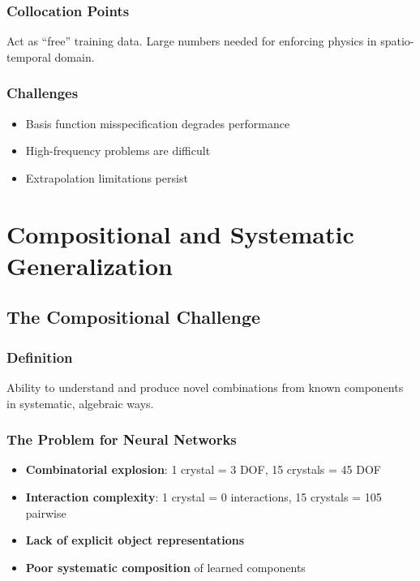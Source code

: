 \subsection{Collocation Points}
Act as ``free'' training data. Large numbers needed for enforcing physics in spatio-temporal domain.

\subsection{Challenges}
\begin{itemize}
    \item Basis function misspecification degrades performance
    \item High-frequency problems are difficult
    \item Extrapolation limitations persist
\end{itemize}

\chapter{Compositional and Systematic Generalization}

\section{The Compositional Challenge}

\subsection{Definition}
Ability to understand and produce novel combinations from known components in systematic, algebraic ways.

\subsection{The Problem for Neural Networks}
\begin{itemize}
    \item \textbf{Combinatorial explosion}: 1 crystal = 3 DOF, 15 crystals = 45 DOF
    \item \textbf{Interaction complexity}: 1 crystal = 0 interactions, 15 crystals = 105 pairwise
    \item \textbf{Lack of explicit object representations}
    \item \textbf{Poor systematic composition} of learned components
\end{itemize}

